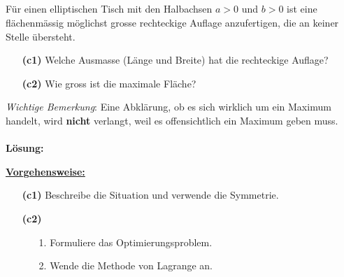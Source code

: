 \subsection*{}
Für einen elliptischen Tisch mit den Halbachsen $ a > 0  $ und $ b > 0 $ ist eine flächenmässig möglichst grosse rechteckige Auflage anzufertigen, die an keiner Stelle übersteht.
\begin{enumerate}
	\item[\textbf{(c1)}]
	Welche Ausmasse (Länge und Breite) hat die rechteckige Auflage?
	\item[\textbf{(c2)}]
	Wie gross ist die maximale Fläche?
\end{enumerate}
\textit{Wichtige Bemerkung}: Eine Abklärung, ob es sich wirklich um ein Maximum handelt, wird \textbf{nicht} verlangt, weil es offensichtlich ein Maximum geben muss.
\\ \\
\textbf{Lösung:}
\begin{mdframed}
\underline{\textbf{Vorgehensweise:}}
\begin{enumerate}
\item[\textbf{(c1)}] Beschreibe die Situation und verwende die Symmetrie.
\item[\textbf{(c2)}] 
\begin{enumerate}
	\item[1.] Formuliere das Optimierungsproblem.
	\item[2.] Wende die Methode von Lagrange an. 
\end{enumerate}
\end{enumerate}
\end{mdframed}

